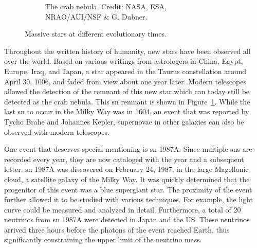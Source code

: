 \begin{figure}[tb]
\begin{subfigure}{0.495\textwidth}
        \caption{The crab nebula. Credit: NASA, ESA, NRAO/AUI/NSF \& G. Dubner.}
        \label{fig:massive_stars:crab_nebula}
    \end{subfigure}
    \caption{Massive stars at different evolutionary times.}
    \label{fig:massive_stars:massive_stars_figure}
\end{figure}
Throughout the written history of humanity, new stars have been observed all over the world. Based on various writings from astrologers in China, Egypt, Europe, Iraq, and Japan, a star appeared in the Taurus constellation around April 30, 1006, and faded from view about one year later. Modern telescopes allowed the detection of the remnant of this new star which can today still be detected as the crab nebula. This \ac{sn} remnant is shown in Figure~\ref{fig:massive_stars:crab_nebula}. While the last \ac{sn} to occur in the Milky Way was in 1604, an event that was reported by Tycho Brahe and Johannes Kepler, supernovae in other galaxies can also be observed with modern telescopes. 

One event that deserves special mentioning is \ac{sn} 1987A. Since multiple \acp{sn} are recorded every year, they are now cataloged with the year and a subsequent letter. \ac{sn} 1987A was discovered on February 24, 1987, in the large Magellanic cloud, a satellite galaxy of the Milky Way. It was quickly determined that the progenitor of this event was a blue supergiant star. The proximity of the event further allowed it to be studied with various techniques. For example, the light curve could be measured and analyzed in detail. Furthermore, a total of 20 neutrinos from \ac{sn} 1987A were detected in Japan and the US. These neutrinos arrived three hours before the photons of the event reached Earth, thus significantly constraining the upper limit of the neutrino mass.

